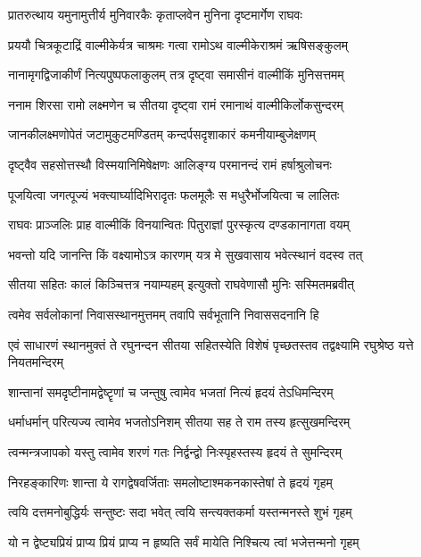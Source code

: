 \twolineshloka
{प्रातरुत्थाय यमुनामुत्तीर्य मुनिवारकैः}
{कृताप्लवेन मुनिना दृष्टमार्गेण राघवः} %

\twolineshloka
{प्रययौ चित्रकूटाद्रिं वाल्मीकेर्यत्र चाश्रमः}
{गत्वा रामोऽथ वाल्मीकेराश्रमं ऋषिसङ्कुलम्} %

\twolineshloka
{नानामृगद्विजाकीर्णं नित्यपुष्पफलाकुलम्}
{तत्र दृष्ट्वा समासीनं वाल्मीकिं मुनिसत्तमम्} %

\twolineshloka
{ननाम शिरसा रामो लक्ष्मणेन च सीतया}
{दृष्ट्वा रामं रमानाथं वाल्मीकिर्लोकसुन्दरम्} %

\twolineshloka
{जानकीलक्ष्मणोपेतं जटामुकुटमण्डितम्}
{कन्दर्पसदृशाकारं कमनीयाम्बुजेक्षणम्} %

\twolineshloka
{दृष्ट्वैव सहसोत्तस्थौ विस्मयानिमिषेक्षणः}
{आलिङ्ग्य परमानन्दं रामं हर्षाश्रुलोचनः} %

\twolineshloka
{पूजयित्वा जगत्पूज्यं भक्त्यार्घ्यादिभिरादृतः}
{फलमूलैः स मधुरैर्भोजयित्वा च लालितः} %

\twolineshloka
{राघवः प्राञ्जलिः प्राह वाल्मीकिं विनयान्वितः}
{पितुराज्ञां पुरस्कृत्य दण्डकानागता वयम्} %

\twolineshloka
{भवन्तो यदि जानन्ति किं वक्ष्यामोऽत्र कारणम्}
{यत्र मे सुखवासाय भवेत्स्थानं वदस्व तत्} %

\twolineshloka
{सीतया सहितः कालं किञ्चित्तत्र नयाम्यहम्}
{इत्युक्तो राघवेणासौ मुनिः सस्मितमब्रवीत्} %

\twolineshloka
{त्वमेव सर्वलोकानां निवासस्थानमुत्तमम्}
{तवापि सर्वभूतानि निवाससदनानि हि} %

\threelineshloka
{एवं साधारणं स्थानमुक्तं ते रघुनन्दन}
{सीतया सहितस्येति विशेषं पृच्छतस्तव}
{तद्वक्ष्यामि रघुश्रेष्ठ यत्ते नियतमन्दिरम्} %

\twolineshloka
{शान्तानां समदृष्टीनामद्वेष्टॄणां च जन्तुषु}
{त्वामेव भजतां नित्यं हृदयं तेऽधिमन्दिरम्} %

\twolineshloka
{धर्माधर्मान् परित्यज्य त्वामेव भजतोऽनिशम्}
{सीतया सह ते राम तस्य हृत्सुखमन्दिरम्} %

\twolineshloka
{त्वन्मन्त्रजापको यस्तु त्वामेव शरणं गतः}
{निर्द्वन्द्वो निःस्पृहस्तस्य हृदयं ते सुमन्दिरम्} %

\twolineshloka
{निरहङ्कारिणः शान्ता ये रागद्वेषवर्जिताः}
{समलोष्टाश्मकनकास्तेषां ते हृदयं गृहम्} %

\twolineshloka
{त्वयि दत्तमनोबुद्धिर्यः सन्तुष्टः सदा भवेत्}
{त्वयि सन्त्यक्तकर्मा यस्तन्मनस्ते शुभं गृहम्} %

\twolineshloka
{यो न द्वेष्ट्यप्रियं प्राप्य प्रियं प्राप्य न हृष्यति}
{सर्वं मायेति निश्चित्य त्वां भजेत्तन्मनो गृहम्} %

